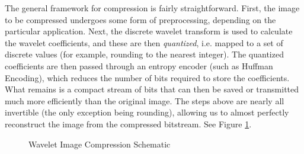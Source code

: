 The general framework for compression is fairly straightforward.
First, the image to be compressed undergoes some form of preprocessing,
depending on the particular application.
Next, the discrete wavelet transform is used to calculate the wavelet coefficients, and these are then \textit{quantized}, i.e. mapped to a set of discrete values (for example, rounding to the nearest integer).
The quantized coefficients are then passed through an entropy encoder (such as Huffman Encoding), which reduces the number of bits required to store the coefficients.
What remains is a compact stream of bits that can then be saved or transmitted much more efficiently than the original image.
The steps above are nearly all invertible (the only exception being rounding), allowing us to almost perfectly reconstruct the image from the compressed bitstream.
See Figure \ref{tikz:wsqscheme}.

\begin{figure}[H]
\centering
{}
\caption{Wavelet Image Compression Schematic}
\label{tikz:wsqscheme}
\end{figure}

